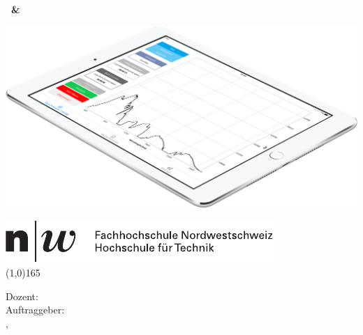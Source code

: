 \thispagestyle{plain}

\begin{titlepage}
	\begin{center}
		\vspace*{1cm}
		\textbf{
			\hspace{-0.12cm}\LARGE{\doctype}\\
			\Huge{\titel}\\
			\vspace{0.5cm}
			\large{\untertitel}\\
			\vspace{1.5cm}
			\large{\autorA \ \& \autorB}\\
		}
		
		\begin{center}
		\vspace*{0.5cm}
		\includegraphics[scale=0.3]{images/ipadAir_Spektrometer}
		\end{center}
		
		\vfill
		\large{
			\hspace{-0.83cm} \includegraphics{images/fhnw_logo}\\
			\line(1,0){165}	

			\vspace{0.5cm}
			Dozent: \dozent \\
			\vspace{0.1cm}
			Auftraggeber:  \auftraggeber \\
			\vspace{0.5cm}
			\ort, \datum
		}
	\end{center}
\end{titlepage}